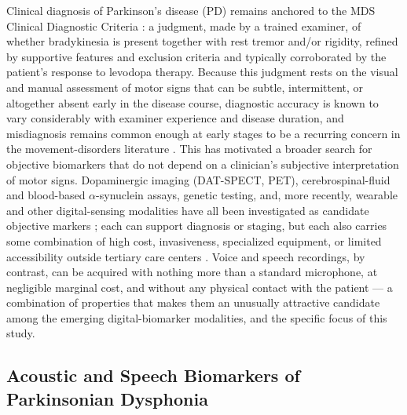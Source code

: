 Clinical diagnosis of Parkinson's disease (PD) remains anchored to the MDS
Clinical Diagnostic Criteria \cite{Postuma:2015}: a judgment, made by a
trained examiner, of whether bradykinesia is present together with rest
tremor and/or rigidity, refined by supportive features and exclusion
criteria and typically corroborated by the patient's response to levodopa
therapy. Because this judgment rests on the visual and manual assessment
of motor signs that can be subtle, intermittent, or altogether absent
early in the disease course, diagnostic accuracy is known to vary
considerably with examiner experience and disease duration, and
misdiagnosis remains common enough at early stages to be a recurring
concern in the movement-disorders literature \cite{Rizzo:2016}. This has
motivated a broader search for objective biomarkers that do not depend on
a clinician's subjective interpretation of motor signs. Dopaminergic
imaging (DAT-SPECT, PET), cerebrospinal-fluid and blood-based
$\alpha$-synuclein assays, genetic testing, and, more recently, wearable
and other digital-sensing modalities have all been investigated as
candidate objective markers \cite{Sun:2024}; each can support diagnosis or
staging, but each also carries some combination of high cost, invasiveness,
specialized equipment, or limited accessibility outside tertiary care
centers \cite{Sun:2024}. Voice and speech recordings, by contrast, can be
acquired with nothing more than a standard microphone, at negligible
marginal cost, and without any physical contact with the patient --- a
combination of properties that makes them an unusually attractive
candidate among the emerging digital-biomarker modalities, and the
specific focus of this study.

\subsection{Acoustic and Speech Biomarkers of Parkinsonian Dysphonia}
\label{sec:2.2}

